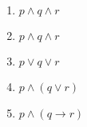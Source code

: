 \begin{enumerate}
\begin{enumerate}
			\item $p\land q\land r$
			
			\item $p\land q\land r$
			
			\item $p\lor q\lor r$
			
			\item $p\land (q\lor r)$
			
			\item $p\land (q\to r)$
				
		\end{enumerate}
		
\end{enumerate}
	
